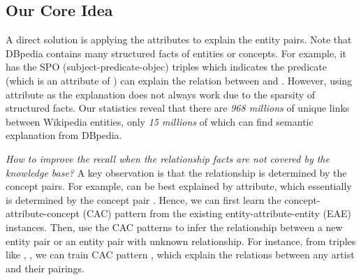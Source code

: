 \subsection{Our Core Idea}
A direct solution is applying the attributes to explain the entity pairs. 
Note that DBpedia contains many structured facts of entities or concepts.
For example, it has the SPO (subject-predicate-objec) triples  which indicates the predicate  (which is an attribute of ) can explain the relation between  and .
However, using attribute as the explanation does not always work due to the sparsity of structured facts. 
Our statistics reveal that there are \emph{968 millions} of unique links between Wikipedia entities, only \emph{15 millions} of which can find semantic explanation from DBpedia.


{\it How to improve the recall when the relationship facts are not covered by the knowledge base?} 
A key observation is that the relationship is determined by the concept pairs. For example,  can be best explained by  attribute, which essentially is determined by the concept pair . Hence, we can first learn the concept-attribute-concept (CAC) pattern from the existing entity-attribute-entity (EAE) instances. Then, use the CAC patterns to infer the relationship between a new entity pair or an entity pair with unknown relationship.
For instance, from triples like , , we can train CAC pattern , which explain the  relations between any artist and their pairings.

